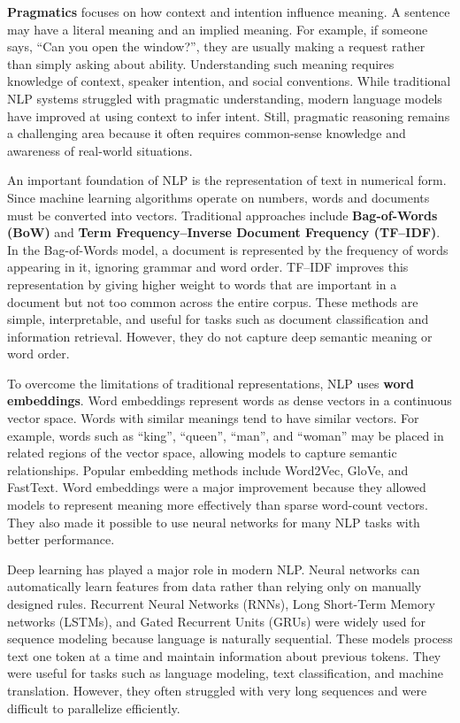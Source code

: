 \documentclass[11pt]{article}
\begin{document}
\textbf{Pragmatics} focuses on how context and intention influence meaning. A sentence may have a literal meaning and an implied meaning. For example, if someone says, ``Can you open the window?'', they are usually making a request rather than simply asking about ability. Understanding such meaning requires knowledge of context, speaker intention, and social conventions. While traditional NLP systems struggled with pragmatic understanding, modern language models have improved at using context to infer intent. Still, pragmatic reasoning remains a challenging area because it often requires common-sense knowledge and awareness of real-world situations.

An important foundation of NLP is the representation of text in numerical form. Since machine learning algorithms operate on numbers, words and documents must be converted into vectors. Traditional approaches include \textbf{Bag-of-Words (BoW)} and \textbf{Term Frequency--Inverse Document Frequency (TF--IDF)}. In the Bag-of-Words model, a document is represented by the frequency of words appearing in it, ignoring grammar and word order. TF--IDF improves this representation by giving higher weight to words that are important in a document but not too common across the entire corpus. These methods are simple, interpretable, and useful for tasks such as document classification and information retrieval. However, they do not capture deep semantic meaning or word order.

To overcome the limitations of traditional representations, NLP uses \textbf{word embeddings}. Word embeddings represent words as dense vectors in a continuous vector space. Words with similar meanings tend to have similar vectors. For example, words such as ``king'', ``queen'', ``man'', and ``woman'' may be placed in related regions of the vector space, allowing models to capture semantic relationships. Popular embedding methods include Word2Vec, GloVe, and FastText. Word embeddings were a major improvement because they allowed models to represent meaning more effectively than sparse word-count vectors. They also made it possible to use neural networks for many NLP tasks with better performance.

Deep learning has played a major role in modern NLP. Neural networks can automatically learn features from data rather than relying only on manually designed rules. Recurrent Neural Networks (RNNs), Long Short-Term Memory networks (LSTMs), and Gated Recurrent Units (GRUs) were widely used for sequence modeling because language is naturally sequential. These models process text one token at a time and maintain information about previous tokens. They were useful for tasks such as language modeling, text classification, and machine translation. However, they often struggled with very long sequences and were difficult to parallelize efficiently.
\end{document}

